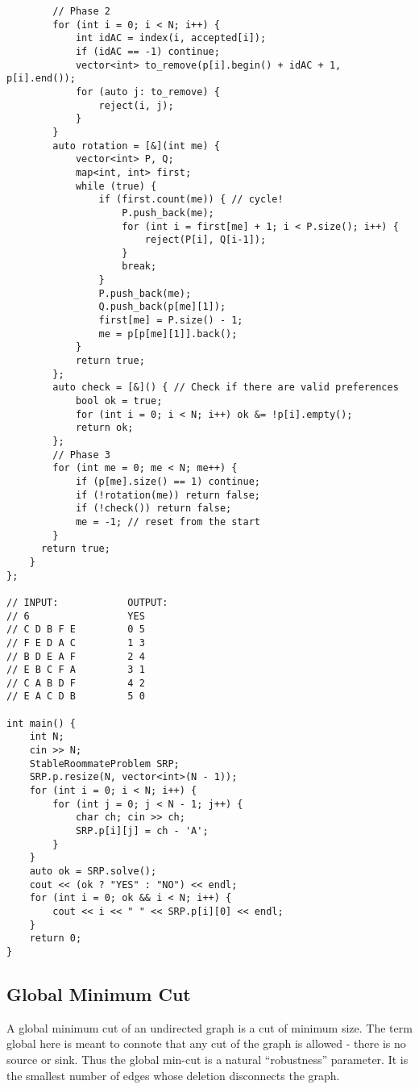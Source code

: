 \begin{lstlisting}
        // Phase 2
        for (int i = 0; i < N; i++) {
            int idAC = index(i, accepted[i]);
            if (idAC == -1) continue;
            vector<int> to_remove(p[i].begin() + idAC + 1, p[i].end());
            for (auto j: to_remove) {
                reject(i, j);
            }
        }
        auto rotation = [&](int me) {
            vector<int> P, Q;
            map<int, int> first;
            while (true) {
                if (first.count(me)) { // cycle!
                    P.push_back(me);
                    for (int i = first[me] + 1; i < P.size(); i++) {
                        reject(P[i], Q[i-1]);
                    }
                    break;
                }
                P.push_back(me);
                Q.push_back(p[me][1]);
                first[me] = P.size() - 1;
                me = p[p[me][1]].back();
            }
            return true;
        };
        auto check = [&]() { // Check if there are valid preferences
            bool ok = true;
            for (int i = 0; i < N; i++) ok &= !p[i].empty();
            return ok;
        };
        // Phase 3
        for (int me = 0; me < N; me++) {
            if (p[me].size() == 1) continue;
            if (!rotation(me)) return false;
            if (!check()) return false;
            me = -1; // reset from the start
        }
      return true;
    }
};

// INPUT:            OUTPUT:
// 6                 YES
// C D B F E         0 5
// F E D A C         1 3
// B D E A F         2 4
// E B C F A         3 1
// C A B D F         4 2
// E A C D B         5 0

int main() {
    int N;
    cin >> N;
    StableRoommateProblem SRP;
    SRP.p.resize(N, vector<int>(N - 1));
    for (int i = 0; i < N; i++) {
        for (int j = 0; j < N - 1; j++) {
            char ch; cin >> ch;
            SRP.p[i][j] = ch - 'A';
        }
    }
    auto ok = SRP.solve();
    cout << (ok ? "YES" : "NO") << endl;
    for (int i = 0; ok && i < N; i++) {
        cout << i << " " << SRP.p[i][0] << endl;
    }
    return 0;
}
\end{lstlisting}

\subsection{Global Minimum Cut}

A global minimum cut of an undirected graph  is a cut of minimum size. 
The term global here is meant to connote that 
any cut of the graph is allowed - there is no source or sink.
Thus the global min-cut is a natural “robustness” parameter.
It is the smallest number of edges whose deletion
disconnects the graph.

